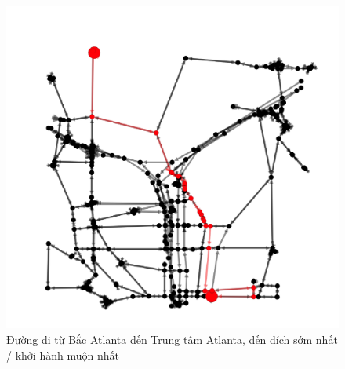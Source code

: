 \documentclass[../main.tex]{subfiles}
\begin{document}

\begin{figure}
    \centering
    \includegraphics{edited-images/Figure16a.jpg}
    \caption{Đường đi từ Bắc Atlanta đến Trung tâm Atlanta, đến đích sớm nhất / khởi hành muộn nhất}
    \label{fig:16}
\end{figure}
\backmatter
\end{document}
